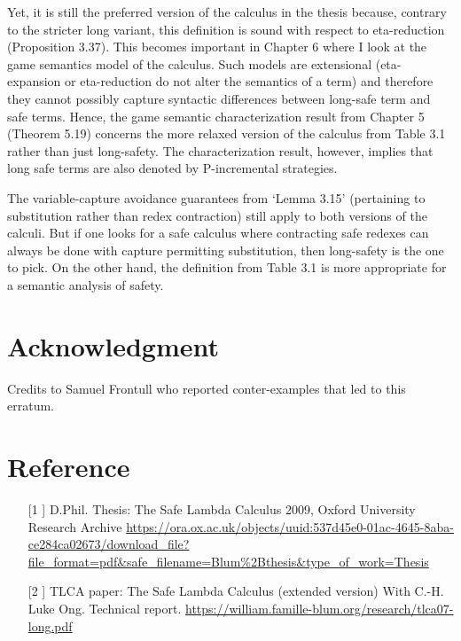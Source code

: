 \documentclass[12pt]{article}
\begin{document}
\begin{enumerate}
Yet, it is still the preferred version of the calculus in the thesis because, contrary to the stricter long variant, this definition is sound with respect to eta-reduction (Proposition 3.37).
This becomes important in Chapter 6 where I look at the game semantics model of the calculus. Such models are extensional (eta-expansion or eta-reduction do not alter the semantics of a term) and therefore they
cannot possibly capture syntactic differences between long-safe term and safe terms.
Hence, the game semantic characterization result from Chapter 5 (Theorem 5.19) concerns the more relaxed version of
the calculus from Table 3.1 rather than just long-safety.
The characterization result, however, implies that long safe terms are also denoted by P-incremental strategies.

The variable-capture avoidance guarantees from `Lemma 3.15' (pertaining to substitution rather than redex contraction) still apply to both versions of the calculi. But if one looks for a safe calculus where contracting safe redexes can always be done with capture permitting substitution, then long-safety is the one to pick. On the other hand,  the definition from Table 3.1 is more appropriate for a semantic analysis of safety.

\end{enumerate}

\section{Acknowledgment}
Credits to Samuel Frontull who reported conter-examples that led to this erratum.

\section{Reference}

\begin{itemize}
    \item[[1]] D.Phil. Thesis: The Safe Lambda Calculus 2009, Oxford University Research Archive
    \url{https://ora.ox.ac.uk/objects/uuid:537d45e0-01ac-4645-8aba-ce284ca02673/download_file?file_format=pdf&safe_filename=Blum%2Bthesis&type_of_work=Thesis}

    \item[[2]] TLCA paper: The Safe Lambda Calculus (extended version) With C.-H. Luke Ong. Technical report. \url{https://william.famille-blum.org/research/tlca07-long.pdf}

\end{itemize}
\end{document}
